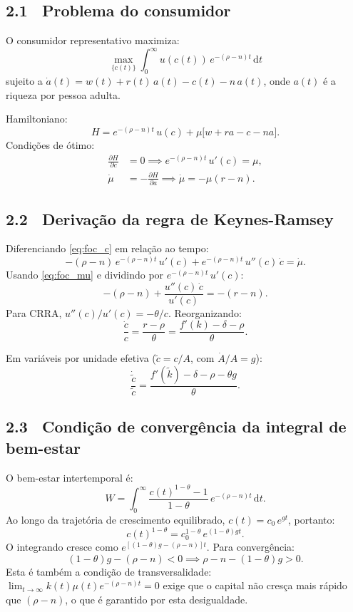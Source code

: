 \documentclass[12pt, a4paper]{article}
\newcommand{\dif}{\mathrm{d}}
\begin{document}
\subsection*{2.1 \ Problema do consumidor}

O consumidor representativo maximiza:
\[
\max_{\{c(t)\}} \int_0^\infty u(c(t))\,e^{-(\rho-n)t}\,\dif t
\]
sujeito a $\dot{a}(t) = w(t) + r(t)\,a(t) - c(t) - n\,a(t)$,
onde $a(t)$ é a riqueza por pessoa adulta.

Hamiltoniano:
\[
H = e^{-(\rho-n)t}\,u(c) + \mu\bigl[w + ra - c - na\bigr].
\]
Condições de ótimo:
\begin{align}
\frac{\partial H}{\partial c} &= 0 \implies e^{-(\rho-n)t}\,u'(c) = \mu, \label{eq:foc_c}\\
\dot{\mu} &= -\frac{\partial H}{\partial a} \implies \dot{\mu} = -\mu(r - n). \label{eq:foc_mu}
\end{align}

\subsection*{2.2 \ Derivação da regra de Keynes-Ramsey}

Diferenciando \eqref{eq:foc_c} em relação ao tempo:
\[
-(\rho-n)\,e^{-(\rho-n)t}\,u'(c) + e^{-(\rho-n)t}\,u''(c)\,\dot{c} = \dot{\mu}.
\]
Usando \eqref{eq:foc_mu} e dividindo por $e^{-(\rho-n)t}\,u'(c)$:
\[
-(\rho-n) + \frac{u''(c)\,\dot{c}}{u'(c)} = -(r-n).
\]
Para CRRA, $u''(c)/u'(c)=-\theta/c$. Reorganizando:
\begin{equation}
\boxed{
\frac{\dot{c}}{c} = \frac{r - \rho}{\theta} = \frac{f'(k) - \delta - \rho}{\theta}.
}
\label{eq:keynes_ramsey}
\end{equation}

Em variáveis por unidade efetiva ($\tilde{c}=c/A$, com $\dot{A}/A=g$):
\[
\frac{\dot{\tilde{c}}}{\tilde{c}} = \frac{f'(\tilde{k}) - \delta - \rho - \theta g}{\theta}.
\]

\subsection*{2.3 \ Condição de convergência da integral de bem-estar}

\begin{formulabox}[title={Derivação da condição de transversalidade}]
O bem-estar intertemporal é:
\[
W = \int_0^\infty \frac{c(t)^{1-\theta}-1}{1-\theta}\,e^{-(\rho-n)t}\,\dif t.
\]
Ao longo da trajetória de crescimento equilibrado, $c(t)=c_0\,e^{gt}$, portanto:
\[
c(t)^{1-\theta} = c_0^{1-\theta}\,e^{(1-\theta)gt}.
\]
O integrando cresce como $e^{[(1-\theta)g - (\rho-n)]t}$. Para convergência:
\[
(1-\theta)g - (\rho-n) < 0
\implies \rho - n - (1-\theta)g > 0.
\]
Esta é também a condição de transversalidade:
$\lim_{t\to\infty} k(t)\mu(t)e^{-(\rho-n)t}=0$ exige que o capital não cresça mais
rápido que $(\rho-n)$, o que é garantido por esta desigualdade.
\end{formulabox}
\end{document}
